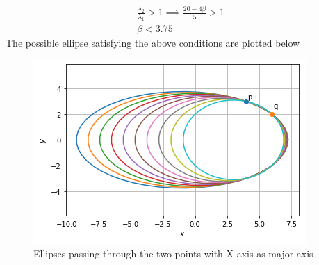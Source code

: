 \documentclass[journal,12pt,twocolumn]{IEEEtran}
\begin{document}
\begin{align}
\frac{\lambda_2}{\lambda_1}>1 \implies
    \frac{20-4\beta}{5}>1\\
    \beta<3.75
\end{align}
The possible ellipse satisfying the above conditions are plotted below
\begin{figure}[!ht]
\centering
\includegraphics[width=\columnwidth]{Ellipse_(I).PNG}
\caption{Ellipses passing through the two points with X axis as major axis}
\label{fig:ellipses}	
\end{figure}
\end{document}

